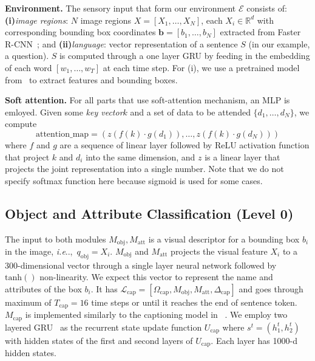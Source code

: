 \documentclass{article}
\makeatletter
\newcommand{\SK}[1]{{\color{NavyBlue}{[@Seung: #1]}}}
\def\E{\mathcal{E}}
\def\Mobj{M_\mathrm{obj}}
\def\Matt{M_\mathrm{att}}
\def\Mcap{M_\mathrm{cap}}
\DeclareRobustCommand\onedot{\futurelet\@let@token\@onedot}
\def\@onedot{\ifx\@let@token.\else.\null\fi\xspace}
\def\ie{\emph{i.e}\onedot} \def\Ie{\emph{I.e}\onedot}
\makeatother
\begin{document}
\textbf{Environment.}\hspace{2mm}
The sensory input that form our environment $\E$ consists of:
{\bf (i)}\emph{image regions}: $N$ image regions $X=[X_1, \ldots, X_N]$, each $X_i \in \mathbb{R}^{d}$ with corresponding bounding box coordinates $\mathbf{b}=[b_1, \ldots, b_N]$ extracted from Faster R-CNN~\citep{ren15}; and
{\bf (ii)}\emph{language}: vector representation of a sentence $S$ (in our example, a question).
$S$ is computed through a one layer GRU by feeding in the embedding of each word $[w_1,\ldots,w_T]$ at each time step.
For (i), we use a pretrained model from~\citet{anderson17} to extract features and bounding boxes.

\textbf{Soft attention.}\hspace{2mm}
For all parts that use soft-attention mechanism, an MLP is emloyed.
Given some \emph{key vector}$k$ and a set of data to be attended $\{d_1,\ldots,d_N\}$, we compute
\begin{equation}
\mathrm{attention\_map} = (z(f(k)\cdot g(d_1)), \ldots, z(f(k)\cdot g(d_N)))
\end{equation}
where $f$ and $g$ are a sequence of linear layer followed by ReLU activation function that project $k$ and $d_i$ into the same dimension, and $z$ is a linear layer that projects the joint representation into a single number.
Note that we do not specify softmax function here because sigmoid is used for some cases.

\subsection{Object and Attribute Classification (Level 0)}
The input to both modules $\Mobj, \Matt$ is a visual descriptor for a bounding box $b_i$ in the image, \ie,~$q_\mathrm{obj} = X_i$.
$\Mobj$ and $\Matt$ projects the visual feature $X_i$ to a 300-dimensional vector through a single layer neural network followed by $\mathrm{tanh}()$ non-linearity.
We expect this vector to represent the name and attributes of the box $b_i$.
It has $\mathcal L_\mathrm{cap} = [\Omega_{\mathrm{cap}}, \Mobj, \Matt, \Delta_{\mathrm{cap}}]$ and goes through maximum of $T_\mathrm{cap}=16$ time steps or until it reaches the end of sentence token.
$\Mcap$ is implemented similarly to the captioning model in ~\citet{anderson17}.
We employ two layered GRU~\citep{cho14} as the recurrent state update function $U_\mathrm{cap}$ where $s^t = (h^t_1, h^t_2)$ with hidden states of the first and second layers of $U_\mathrm{cap}$. Each layer has 1000-d hidden states.
\end{document}
